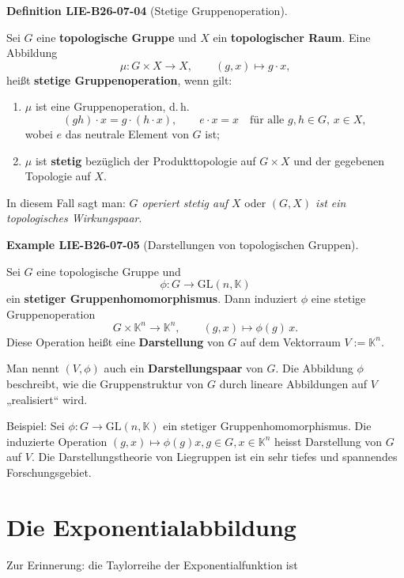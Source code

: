 \documentclass[10pt, letterpaper]{article}
\newcommand{\CustomHeading}[3]{%
  \par\medskip\noindent%
  \textbf{#1 #2} \textnormal{(#3)}.\enskip%
}
\newenvironment{DEF}[2]{\begin{unitbox}\CustomHeading{Definition}{#1}{#2}}{\end{unitbox}}
\newenvironment{EXA}[2]{\begin{unitbox}\CustomHeading{Example}{#1}{#2}}{\end{unitbox}}
\begin{document}
\begin{DEF}{LIE-B26-07-04}{Stetige Gruppenoperation}
Sei $G$ eine \textbf{topologische Gruppe} und $X$ ein \textbf{topologischer Raum}.  
Eine Abbildung
\[
\mu : G \times X \longrightarrow X, \qquad (g, x) \longmapsto g \cdot x,
\]
heißt \textbf{stetige Gruppenoperation}, wenn gilt:
\begin{enumerate}
    \item $\mu$ ist eine Gruppenoperation, d.\,h.
    \[
    (g h)\cdot x = g\cdot(h\cdot x), \qquad e\cdot x = x \quad \text{für alle } g,h \in G,\, x \in X,
    \]
    wobei $e$ das neutrale Element von $G$ ist;
    \item $\mu$ ist \textbf{stetig} bezüglich der Produkttopologie auf $G\times X$ und der gegebenen Topologie auf $X$.
\end{enumerate}
In diesem Fall sagt man: \emph{$G$ operiert stetig auf $X$} oder \emph{$(G,X)$ ist ein topologisches Wirkungs­paar}.
\end{DEF}



\begin{EXA}{LIE-B26-07-05}{Darstellungen von topologischen Gruppen}
Sei $G$ eine topologische Gruppe und 
\[
\phi : G \longrightarrow \mathrm{GL}(n,\mathbb{K})
\]
ein \textbf{stetiger Gruppenhomomorphismus}.  
Dann induziert $\phi$ eine stetige Gruppenoperation
\[
G \times \mathbb{K}^{n} \longrightarrow \mathbb{K}^{n}, 
\qquad (g, x) \longmapsto \phi(g)\,x.
\]
Diese Operation heißt eine \textbf{Darstellung} von $G$ auf dem Vektorraum 
$V := \mathbb{K}^{n}$.

\smallskip
Man nennt $(V,\phi)$ auch ein \textbf{Darstellungspaar} von $G$.  
Die Abbildung $\phi$ beschreibt, wie die Gruppenstruktur von $G$ 
durch lineare Abbildungen auf $V$ „realisiert“ wird.
\end{EXA}



Beispiel: Sei $\phi: G \rightarrow \mathrm{GL}(n, \mathbb{K})$ ein stetiger Gruppenhomomorphismus. Die induzierte Operation $(g, x) \mapsto \phi(g) x, g \in G, x \in \mathbb{K}^{n}$ heisst Darstellung von $G$ auf $V$. Die Darstellungstheorie von Liegruppen ist ein sehr tiefes und spannendes Forschungsgebiet.




\pagebreak



\section{Die Exponentialabbildung}
Zur Erinnerung: die Taylorreihe der Exponentialfunktion ist
\end{document}

